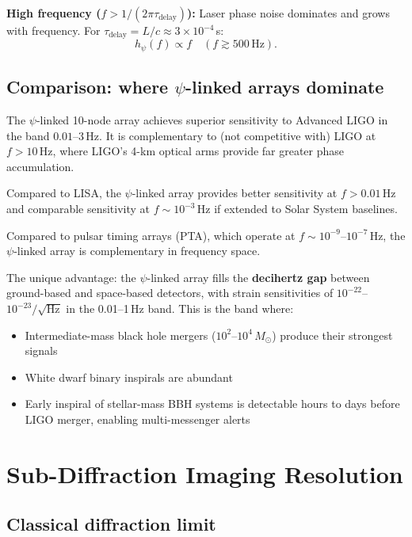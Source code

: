\documentclass[aps,prl,twocolumn,superscriptaddress,showpacs]{revtex4-2}
\theoremstyle{definition}
\begin{document}
\textbf{High frequency ($f > 1/(2\pi\tau_{\mathrm{delay}})$):}
Laser phase noise dominates and grows with frequency. For
$\tau_{\mathrm{delay}} = L/c \approx 3\times 10^{-4}$\,s:
\begin{equation}
h_\psi(f) \propto f \quad (f \gtrsim 500\,\text{Hz}).
\label{eq:high-freq}
\end{equation}

\subsection{Comparison: where $\psi$-linked arrays dominate}

The $\psi$-linked 10-node array achieves superior sensitivity to
Advanced LIGO in the band $0.01$--$3$\,Hz. It is complementary to
(not competitive with) LIGO at $f > 10$\,Hz, where LIGO's 4-km
optical arms provide far greater phase accumulation.

Compared to LISA, the $\psi$-linked array provides better sensitivity
at $f > 0.01$\,Hz and comparable sensitivity at $f \sim 10^{-3}$\,Hz
if extended to Solar System baselines.

Compared to pulsar timing arrays (PTA), which operate at
$f \sim 10^{-9}$--$10^{-7}$\,Hz, the $\psi$-linked array is
complementary in frequency space.

The unique advantage: the $\psi$-linked array fills the
\textbf{decihertz gap} between ground-based and space-based detectors,
with strain sensitivities of $10^{-22}$--$10^{-23}/\sqrt{\mathrm{Hz}}$
in the 0.01--1\,Hz band. This is the band where:
\begin{itemize}
\item Intermediate-mass black hole mergers ($10^2$--$10^4\,M_\odot$)
produce their strongest signals
\item White dwarf binary inspirals are abundant
\item Early inspiral of stellar-mass BBH systems is detectable hours
to days before LIGO merger, enabling multi-messenger alerts
\end{itemize}

\section{Sub-Diffraction Imaging Resolution}\label{sec:imaging}

\subsection{Classical diffraction limit}
\end{document}
